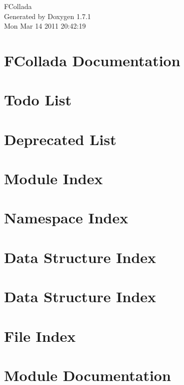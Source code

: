 \documentclass[a4paper]{book}
\begin{document}
\hypersetup{pageanchor=false}
\begin{titlepage}
\vspace*{7cm}
\begin{center}
{\Large FCollada }\\
\vspace*{1cm}
{\large Generated by Doxygen 1.7.1}\\
\vspace*{0.5cm}
{\small Mon Mar 14 2011 20:42:19}\\
\end{center}
\end{titlepage}
\clearemptydoublepage
{}
\tableofcontents
\clearemptydoublepage
{}
\hypersetup{pageanchor=true}
\chapter{FCollada Documentation}
\label{index}\hypertarget{index}{}
\chapter{Todo List}
\label{todo}
\hypertarget{todo}{}

\chapter{Deprecated List}
\label{deprecated}
\hypertarget{deprecated}{}

\chapter{Module Index}

\chapter{Namespace Index}

\chapter{Data Structure Index}

\chapter{Data Structure Index}

\chapter{File Index}

\chapter{Module Documentation}








\end{document}
